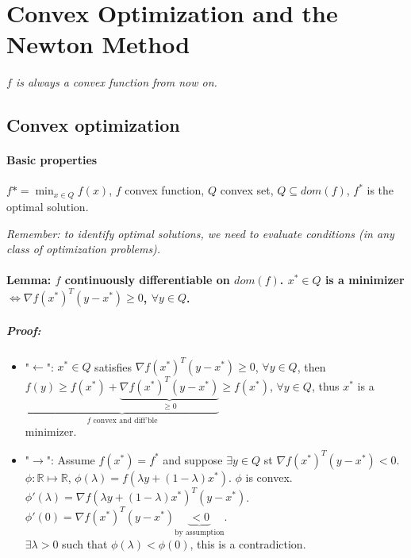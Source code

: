 \documentclass[main]{subfiles}
\begin{document}

\section{Convex Optimization and the Newton Method}

\emph{$f$ is always a convex function from now on.}

\subsection{Convex optimization}
\paragraph{Basic properties}
$f* = \displaystyle \min_{x \in Q} f(x)$, $f$ convex function, $Q$ convex
set, $Q \subseteq dom(f)$, $f^*$ is the optimal solution.

\emph{Remember: to identify optimal solutions, we need to evaluate conditions
(in any class of optimization problems).}

\paragraph{Lemma: $f$ continuously differentiable on $dom(f)$. $x^* \in Q$ is a
minimizer $\iff \nabla f(x^*)^T (y-x^*) \geq 0$, $\forall y \in Q$.}

\subparagraph{Proof:}
\begin{itemize}
\item "$\leftarrow$":
\subitem $x^* \in Q$ satisfies $\nabla f(x^*)^T (y-x^*) \geq 0$, $\forall y
\in Q$, then $\underbrace{f(y) \geq f(x^*) + \underbrace{\nabla f(x^*)^T (y-x^*)}_{\geq 0}}_{\text{$f$ convex and diff'ble}} \geq f(x^*)$,
$\forall y \in Q$, thus $x^*$ is a minimizer.
\item "$\rightarrow$":
\subitem Assume $f(x^*) = f^*$ and suppose $\exists y \in Q$ st $\nabla 
f(x^*)^T (y-x^*) < 0$.\\
$\phi: \mathbb{R} \mapsto \mathbb{R}$, $\phi(\lambda) = f(\lambda y +
(1-\lambda)x^*)$. $\phi$ is convex.\\
$\phi'(\lambda) = \nabla f(\lambda y + (1-\lambda)x^*)^T (y-x^*)$.\\
$\phi'(0) = \nabla f(x^*)^T(y-x^*) \underbrace{< 0}_{\text{by assumption}}$.\\
$\exists \lambda > 0$ such that $\phi(\lambda) < \phi(0)$, this is a
contradiction.
\end{itemize}
\end{document}
